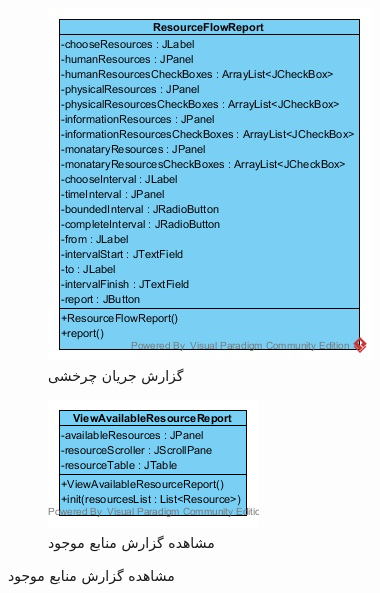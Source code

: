 \begin{figure}[H]
\begin{subfigure}[b]{0.3\textwidth}
		\includegraphics[width=\textwidth]{img/class-design/ui/ResourceFlowReport.jpg}
		\caption{گزارش جریان چرخشی }
	\end{subfigure}
	\begin{subfigure}[b]{0.3\textwidth}
		\includegraphics[width=\textwidth]{img/class-design/ui/ViewAvailableResourceReport.png}
		\caption{مشاهده گزارش منابع موجود}
	\end{subfigure}


\end{figure}
